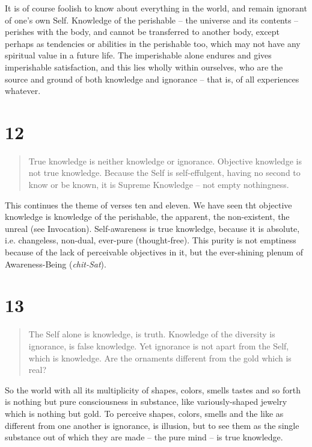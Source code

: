 \documentclass[12pt]{report}
\begin{document}

It is of course foolish to know about everything in the world, and
remain ignorant of one's own Self. Knowledge of the perishable -- the
universe and its contents -- perishes with the body, and cannot be
transferred to another body, except perhaps as tendencies or abilities
in the perishable too, which may not have any spiritual value in a
future life. The imperishable alone endures and gives imperishable
satisfaction, and this lies wholly within ourselves, who are the
source and ground of both knowledge and ignorance -- that is, of all
experiences whatever.

\section*{12}

\begin{quote}
True knowledge is neither knowledge or ignorance. Objective knowledge
is not true knowledge. Because the Self is self-effulgent, having no
second to know or be known, it is Supreme Knowledge -- not empty
nothingness.
\end{quote}


This continues the theme of verses ten and eleven. We have seen tht
objective knowledge is knowledge of the perishable, the apparent, the
non-existent, the unreal (see Invocation). Self-awareness is true
knowledge, because it is absolute, i.e. changeless, non-dual,
ever-pure (thought-free). This purity is not emptiness because of the
lack of perceivable objectives in it, but the ever-shining plenum of
Awareness-Being (\emph{chit-Sat}).

\section*{13}

\begin{quote}
The Self alone is knowledge, is truth. Knowledge of the diversity is
ignorance, is false knowledge. Yet ignorance is not apart from the
Self, which is knowledge. Are the ornaments different from the gold
which is real?
\end{quote}


So the world with all its multiplicity of shapes, colors, smells
tastes and so forth is nothing but pure consciousness in substance,
like variously-shaped jewelry which is nothing but gold. To perceive
shapes, colors, smells and the like as different from one another is
ignorance, is illusion, but to see them as the single substance out of
which they are made -- the pure mind -- is true knowledge.
\end{document}
